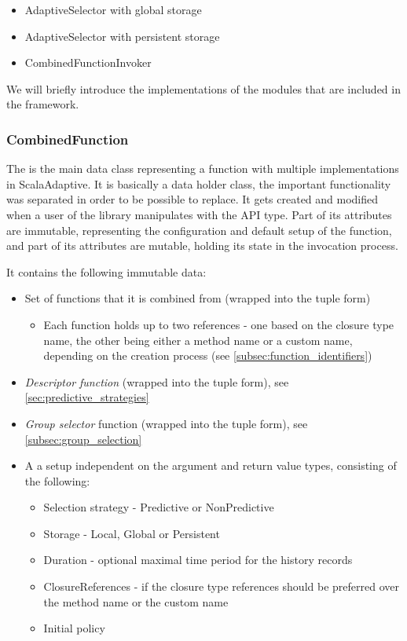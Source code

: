 \begin{itemize}
	\item AdaptiveSelector with global storage
	\item AdaptiveSelector with persistent storage
	\item CombinedFunctionInvoker
\end{itemize}

We will briefly introduce the implementations of the modules that are included in the framework.

\subsubsection{CombinedFunction}

The  is the main data class representing a function with multiple implementations in ScalaAdaptive. It is basically a data holder class, the important functionality was separated in order to be possible to replace. It gets created and modified when a user of the library manipulates with the  API type. Part of its attributes are immutable, representing the configuration and default setup of the function, and part of its attributes are mutable, holding its state in the invocation process.

It contains the following immutable data:

\begin{itemize}
	\item Set of functions that it is combined from (wrapped into the tuple form)
	\begin{itemize}
		\item	Each function holds up to two references - one based on the closure type name, the other being either a method name or a custom name, depending on the creation process (see \ref{subsec:function_identifiers})
	\end{itemize}
	\item \textit{Descriptor function} (wrapped into the tuple form), see \ref{sec:predictive_strategies}
	\item \textit{Group selector} function (wrapped into the tuple form), see \ref{subsec:group_selection}
	\item A  a setup independent on the argument and return value types, consisting of the following:
	\begin{itemize}
		\item Selection strategy - Predictive or NonPredictive
		\item Storage - Local, Global or Persistent
		\item Duration - optional maximal time period for the history records
		\item ClosureReferences - if the closure type references should be preferred over the method name or the custom name
		\item Initial policy
	\end{itemize}
\end{itemize}

